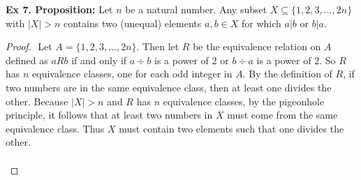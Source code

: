 \documentclass{article}
\begin{document}
\textbf{Ex 7. Proposition:} Let $n$ be a natural number. Any subset $X \subseteq \{1,2,3,...,2n\}$ with $|X| > n$ contains two (unequal) elements $a, b \in X$ for which $a|b$ or $b|a$.
\begin{proof}
$ $\newline
Let $A=\{1,2,3,...,2n\}$. Then let $R$ be the equivalence relation on $A$ defined as $a R b$ if and only if $a \div b$ is a power of $2$ or $b \div a$ is a power of $2$. So $R$ has $n$ equivalence classes, one for each odd integer in $A$. By the definition of $R$, if two numbers are in the same equivalence class, then at least one divides the other. Because $|X|>n$ and $R$ has $n$ equivalence classes, by the pigeonhole principle, it follows that at least two numbers in $X$ must come from the same equivalence class. Thus $X$ must contain two elements such that one divides the other.\\
\\
\end{proof}
\end{document}
